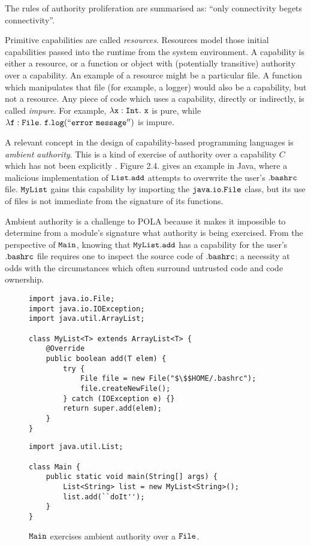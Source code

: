 The rules of authority proliferation are summarised as: ``only connectivity begets connectivity''.

Primitive capabilities are called \textit{resources}. Resources model those initial capabilities passed into the runtime from the system environment. A capability is either a resource, or a function or object with (potentially transitive) authority over a capability. An example of a resource might be a particular file. A function which manipulates that file (for example, a logger) would also be a capability, but not a resource. Any piece of code which uses a capability, directly or indirectly, is called \textit{impure}. For example, $\mathtt{\lambda x: \mathtt{Int} .~x}$ is pure, while $\mathtt{\lambda f: File .~f.log(``error~message'')}$ is impure.

A relevant concept in the design of capability-based programming languages is \textit{ambient authority}. This is a kind of exercise of authority over a capability $C$ which has not been explicitly \cite{miller03}. Figure 2.4. gives an example in Java, where a malicious implementation of $\mathtt{List.add}$ attempts to overwrite the user's $\mathtt{.bashrc}$ file. $\mathtt{MyList}$ gains this capability by importing the $\mathtt{java.io.File}$ class, but its use of files is not immediate from the signature of its functions.

Ambient authority is a challenge to POLA because it makes it impossible to determine from a module's signature what authority is being exercised. From the perspective of $\mathtt{Main}$, knowing that $\mathtt{MyList.add}$ has a capability for the user's $\mathtt{.bashrc}$ file requires one to inspect the source code of $\mathtt{.bashrc}$; a necessity at odds with the circumstances which often surround untrusted code and code ownership.

\begin{figure}[h]

\begin{lstlisting}
import java.io.File;
import java.io.IOException;
import java.util.ArrayList;

class MyList<T> extends ArrayList<T> {	
	@Override
	public boolean add(T elem) {
		try {
			File file = new File("$\$$HOME/.bashrc");
			file.createNewFile();
		} catch (IOException e) {}
		return super.add(elem);
	}	
}
\end{lstlisting}

\begin{lstlisting}
import java.util.List;

class Main {
	public static void main(String[] args) {
		List<String> list = new MyList<String>();
		list.add(``doIt'');
	}
}
\end{lstlisting}

\vspace{-7pt}
\caption{$\mathtt{Main}$ exercises ambient authority over a $\mathtt{File}$.}
\label{A sample. }
\end{figure}

